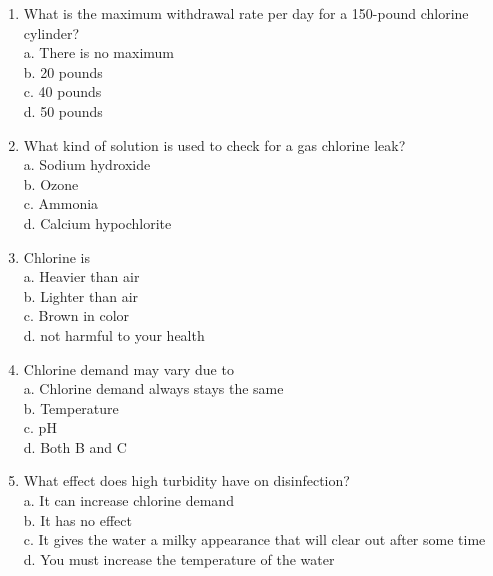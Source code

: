 \documentclass[10pt]{article}
\begin{document}
\begin{enumerate}
  \item What is the maximum withdrawal rate per day for a 150-pound chlorine cylinder?\\
a. There is no maximum\\
b. 20 pounds\\
c. 40 pounds\\
d. 50 pounds

  \item What kind of solution is used to check for a gas chlorine leak?\\
a. Sodium hydroxide\\
b. Ozone\\
c. Ammonia\\
d. Calcium hypochlorite

  \item Chlorine is\\
a. Heavier than air\\
b. Lighter than air\\
c. Brown in color\\
d. not harmful to your health

  \item Chlorine demand may vary due to\\
a. Chlorine demand always stays the same\\
b. Temperature\\
c. $\mathrm{pH}$\\
d. Both B and C

  \item What effect does high turbidity have on disinfection?\\
a. It can increase chlorine demand\\
b. It has no effect\\
c. It gives the water a milky appearance that will clear out after some time\\
d. You must increase the temperature of the water

\end{enumerate}
\end{document}
